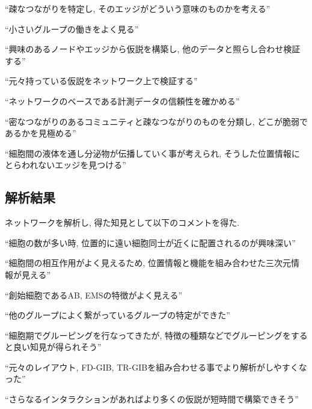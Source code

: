 \documentclass{kuee}
\begin{document}
``疎なつながりを特定し, そのエッジがどういう意味のものかを考える''

``小さいグループの働きをよく見る''

``興味のあるノードやエッジから仮説を構築し, 他のデータと照らし合わせ検証する''

``元々持っている仮説をネットワーク上で検証する''

``ネットワークのベースである計測データの信頼性を確かめる''

``密なつながりのあるコミュニティと疎なつながりのものを分類し, どこが脆弱であるかを見極める''

``細胞間の液体を通し分泌物が伝播していく事が考えられ, そうした位置情報にとらわれないエッジを見つける''

\subsection{解析結果}
ネットワークを解析し, 得た知見として以下のコメントを得た.

``細胞の数が多い時, 位置的に遠い細胞同士が近くに配置されるのが興味深い''

``細胞間の相互作用がよく見えるため, 位置情報と機能を組み合わせた三次元情報が見える''

``創始細胞であるAB, EMSの特徴がよく見える''

``他のグループによく繋がっているグループの特定ができた''

``細胞期でグルーピングを行なってきたが, 特徴の種類などでグルーピングをすると良い知見が得られそう''

``元々のレイアウト, FD-GIB, TR-GIBを組み合わせる事でより解析がしやすくなった''

``さらなるインタラクションがあればより多くの仮説が短時間で構築できそう''
\end{document}
